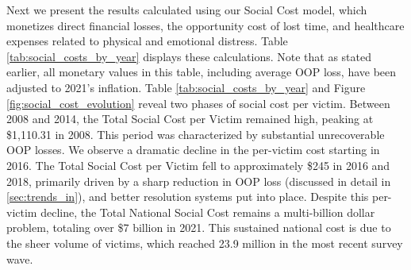 Next we present the results calculated using our Social Cost model, which monetizes direct financial losses, the opportunity cost of lost time, and healthcare expenses related to physical and emotional distress. Table \ref{tab:social_costs_by_year} displays these calculations. Note that as stated earlier, all monetary values in this table, including average OOP loss, have been adjusted to 2021's inflation. Table \ref{tab:social_costs_by_year} and Figure \ref{fig:social_cost_evolution} reveal two phases of social cost per victim. Between 2008 and 2014, the Total Social Cost per Victim remained high, peaking at \$1,110.31 in 2008. This period was characterized by substantial unrecoverable OOP losses. We observe a dramatic decline in the per-victim cost starting in 2016. The Total Social Cost per Victim fell to approximately \$245 in 2016 and 2018, primarily driven by a sharp reduction in OOP loss (discussed in detail in \ref{sec:trends_in}), and better resolution systems put into place. Despite this per-victim decline, the Total National Social Cost remains a multi-billion dollar problem, totaling over \$7 billion in 2021. This sustained national cost is due to the sheer volume of victims, which reached 23.9 million in the most recent survey wave. 







